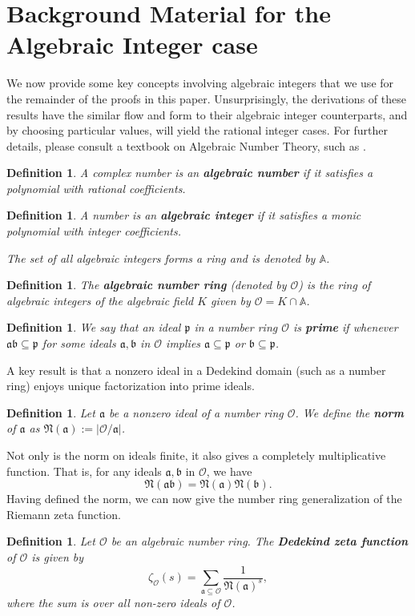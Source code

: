 \documentclass[12pt]{amsart}
\newtheorem{definition}[theorem]{Definition}
\theoremstyle{definition}
\newcommand{\f}[1]{\mathfrak{#1}}
\begin{document}
\section{Background Material for the Algebraic Integer case}
We now provide some key concepts involving algebraic integers that we use for the remainder of the proofs in this paper. Unsurprisingly, the derivations of these results have the similar flow and form to their algebraic integer counterparts, and by choosing particular values, will yield the rational integer cases. For further details, please consult a textbook on Algebraic Number Theory, such as \cite{Marcus}.

\begin{definition} A complex number is an \textbf{algebraic number} if it satisfies a polynomial with rational coefficients.
\end{definition}

\begin{definition}A number is an \textbf{algebraic integer} if it satisfies a monic polynomial with integer coefficients.
	
	The set of all algebraic integers forms a ring and is denoted by \(\mathbb{A}\).
\end{definition}

\begin{definition} The \textbf{algebraic number ring} (denoted by \(\mathcal{O}\)) is the ring of algebraic integers of the algebraic field \(K\) given by \(\mathcal{O}=K\cap \mathbb{A}\). 
\end{definition}

\begin{definition} 
	We say that an ideal \(\f{p}\) in a number ring $\mathcal{O}$ is \textbf{prime} if whenever \(\f{ab}\subseteq \f{p}\) for some ideals \(\f{a},\f{b}\) in $\mathcal{O}$ implies \(\f{a}\subseteq \f{p}\) or \(\f{b} \subseteq \f{p}\).  
\end{definition}
A key result is that a nonzero ideal in a Dedekind domain (such as a number ring) enjoys unique factorization into prime ideals. 

\begin{definition} \label{ideal-norm}
	Let $\mathfrak{a}$ be a nonzero ideal of a number ring $\mathcal{O}$. We
	define the \textbf{norm} of \(\f{a}\) as \(\f{N(a)}:=|\mathcal{O}/\f{a}|\).
\end{definition}

Not only is the norm on ideals finite, it also gives a completely multiplicative function. That is, for any ideals $\mathfrak{a}, \mathfrak{b}$ in $\mathcal{O}$, we have
$$\mathfrak{N}(\mathfrak{a} \mathfrak{b}) = \mathfrak{N}(\mathfrak{a}) \mathfrak{N}(\mathfrak{b}).$$
Having defined the norm, we can now give the number ring generalization of the Riemann zeta function. 
\begin{definition} Let \(\mathcal{O}\) be an algebraic number ring. The \textbf{Dedekind zeta function} of \(\mathcal{O}\) is given by 
$$\zeta_\mathcal{O}(s)=\sum_{\f{a\subseteq \mathcal{O}}}\frac{1}{\mathfrak{N}(\mathfrak{a})^s},$$
where the sum is over all non-zero ideals of \(\mathcal{O}\).
\end{definition}
\end{document}

